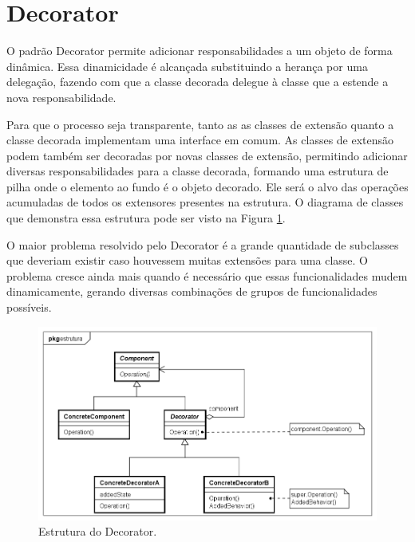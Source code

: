 \section{Decorator}

O padrão Decorator permite adicionar responsabilidades a um 
objeto de forma dinâmica. Essa dinamicidade é alcançada 
substituindo a herança por uma delegação, fazendo com 
que a classe decorada delegue à classe que a estende 
a nova responsabilidade.\cite{gamma:1995}

Para que o processo seja transparente, tanto as 
as classes de extensão quanto a classe decorada 
implementam uma interface em comum. As classes 
de extensão podem também ser decoradas por 
novas classes de extensão, permitindo adicionar 
diversas responsabilidades para a classe decorada, 
formando uma estrutura de pilha onde o elemento ao 
fundo é o objeto decorado. Ele será o 
alvo das operações acumuladas de todos os extensores 
presentes na estrutura. O diagrama de classes que 
demonstra essa estrutura pode ser visto na Figura 
\ref{decorator_struct}.

O maior problema resolvido pelo Decorator é a grande 
quantidade de subclasses que deveriam existir caso houvessem 
muitas extensões para uma classe. O problema cresce ainda 
mais quando é necessário que essas funcionalidades mudem 
dinamicamente, gerando diversas combinações de grupos de 
funcionalidades possíveis.

\begin{figure}[htb]
	\caption{\label{decorator_struct}Estrutura do Decorator.}
	\begin{center}
	    \includegraphics[scale=0.5]{5_padroes-contexto-funcional/5.2_estruturais/5.2.4_decorator/decorator_estrutura.png}
	\end{center}
\end{figure}

